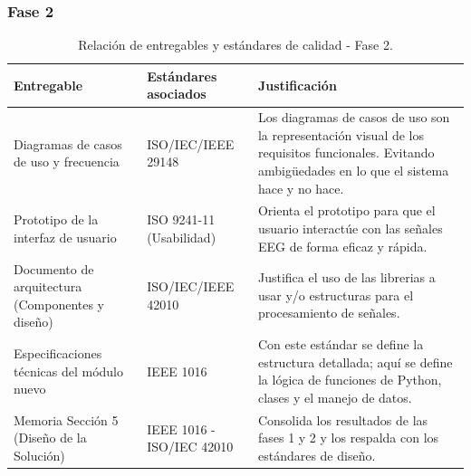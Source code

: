 \documentclass[12pt,letterpaper]{article}
\begin{document}
\subsubsection{Fase 2}
\begin{table}[H]
\small
\centering
\renewcommand{\arraystretch}{1.4}
\begin{tabularx}{\textwidth}{|>{\hsize=0.7\hsize}X|>{\hsize=0.8\hsize}X|>{\hsize=1.5\hsize}X|}
\hline
\textbf{Entregable} & \textbf{Estándares asociados} & \textbf{Justificación} \\ \hline
Diagramas de casos de uso y frecuencia & ISO/IEC/IEEE 29148 & Los diagramas de casos de uso son la representación visual de los requisitos funcionales. Evitando ambigüedades en lo que el sistema hace y no hace. \\ \hline

Prototipo de la interfaz de usuario & ISO 9241-11 (Usabilidad) & Orienta el prototipo para que el usuario interactúe con las señales EEG de forma eficaz y rápida. \\ \hline

Documento de arquitectura (Componentes y diseño) & ISO/IEC/IEEE 42010 & Justifica el uso de las librerias a usar y/o estructuras para el procesamiento de señales. \\ \hline

Especificaciones técnicas del módulo nuevo & IEEE 1016 & Con este estándar se define la estructura detallada; aquí se define la lógica de funciones de Python, clases y el manejo de datos. \\ \hline

Memoria Sección 5 (Diseño de la Solución) & IEEE 1016 - ISO/IEC 42010 & Consolida los resultados de las fases 1 y 2 y los respalda con los estándares de diseño. \\ \hline
\end{tabularx}
\caption{Relación de entregables y estándares de calidad - Fase 2.}
\end{table}

\end{document}
